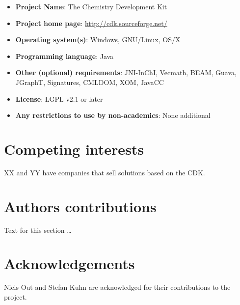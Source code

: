 \documentclass[10pt]{bmc_article}
\newenvironment{bmcformat}{\begin{raggedright}\baselineskip20pt\sloppy\setboolean{publ}{false}}{\end{raggedright}\baselineskip20pt\sloppy}
\begin{document}
\begin{bmcformat}
\begin{itemize}
\item \textbf{Project Name}: The Chemistry Development Kit
\item \textbf{Project home page}: \url{http://cdk.sourceforge.net/}
\item \textbf{Operating system(s)}: Windows, GNU/Linux, OS/X
\item \textbf{Programming language}: Java
\item \textbf{Other (optional) requirements}: JNI-InChI, Vecmath, BEAM, Guava, JGraphT, Signatures, CMLDOM, XOM, JavaCC
\item \textbf{License}: LGPL v2.1 or later
\item \textbf{Any restrictions to use by non-academics}: None additional
\end{itemize}

\section*{Competing interests}
XX and YY have companies that sell solutions based on the CDK.

\section*{Authors contributions}
    Text for this section \ldots

    

\section*{Acknowledgements}
Niels Out and Stefan Kuhn are acknowledged for their contributions to the project.


{
  
}





%




\end{bmcformat}
\end{document}
